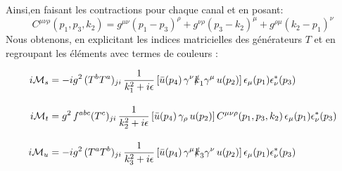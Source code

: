 \documentclass[12pt, a4paper]{article}
\begin{document}
 	Ainsi,en faisant les contractions pour chaque canal et en posant: \[ C^{\mu\nu\rho}(p_1, p_3, k_2)=g^{\mu \nu}(p_1 -p_3)^{\rho}+g^{\nu \rho}(p_3 -k_2)^{\mu}+g^{\rho \mu}(k_2 -p_1)^{\nu}\]
 	Nous obtenons, en explicitant les indices matricielles des générateurs 	\(T\) et en regroupant les éléments avec termes de couleurs :
 
 	\begin{equation*}
 		\begin{split}
 			i\mathcal{M}_s &= -i g^2 \, (T^b T^a)_{ji} \, \frac{1}{k_1^2+ i\epsilon} \left[ \bar{u}(p_4) \, \gamma^\nu \slashed{k}_1 \gamma^\mu \, u(p_2) \right] \epsilon_\mu(p_1) \epsilon_\nu^*(p_3) \\[1em]
 			i\mathcal{M}_t &= g^2 \, f^{abc} (T^c)_{ji} \, \frac{1}{k_2^2+ i\epsilon} \left[ \bar{u}(p_4) \, \gamma_\rho \, u(p_2) \right] C^{\mu\nu\rho}(p_1, p_3, k_2) \, \epsilon_\mu(p_1) \epsilon_\nu^*(p_3) \\[1em]
 			i\mathcal{M}_u &= -i g^2 \, (T^a T^b)_{ji} \, \frac{1}{k_3^2+ i\epsilon} \left[ \bar{u}(p_4) \, \gamma^\mu \slashed{k}_3 \gamma^\nu \, u(p_2) \right] \epsilon_\mu(p_1) \epsilon_\nu^*(p_3)
 		\end{split}
 	\end{equation*}
 	
\end{document}
